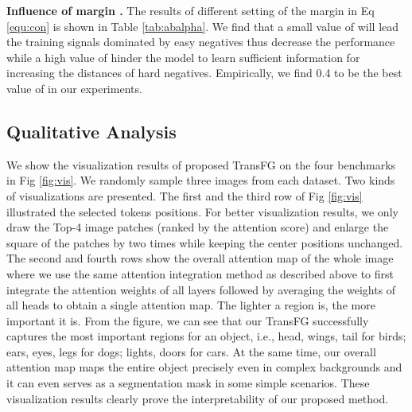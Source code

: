 \noindent \textbf{Influence of margin .} The results of different setting of the margin  in Eq \ref{equ:con} is shown in Table \ref{tab:abalpha}. We find that a small value of  will lead the training signals dominated by easy negatives thus decrease the performance while a high value of  hinder the model to learn sufficient information for increasing the distances of hard negatives. Empirically, we find 0.4 to be the best value of  in our experiments. 

\subsection{Qualitative Analysis}
\label{sec:qual}

We show the visualization results of proposed TransFG on the four benchmarks in Fig \ref{fig:vis}. We randomly sample three images from each dataset. Two kinds of visualizations are presented. The first and the third row of Fig \ref{fig:vis} illustrated the selected tokens positions. For better visualization results, we only draw the Top-4 image patches (ranked by the attention score) and enlarge the square of the patches by two times while keeping the center positions unchanged. The second and fourth rows show the overall attention map of the whole image where we use the same attention integration method as described above to first integrate the attention weights of all layers followed by averaging the weights of all heads to obtain a single attention map. The lighter a region is, the more important it is. From the figure, we can see that our TransFG successfully captures the most important regions for an object, i.e., head, wings, tail for birds; ears, eyes, legs for dogs; lights, doors for cars. At the same time, our overall attention map maps the entire object precisely even in complex backgrounds and it can even serves as a segmentation mask in some simple scenarios. These visualization results clearly prove the interpretability of our proposed method.